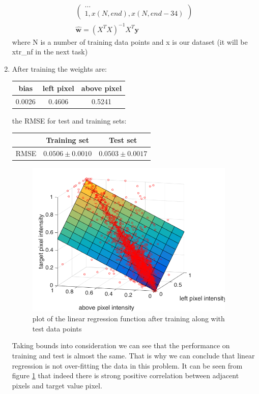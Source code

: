 \documentclass{article}
\newcommand{\vect}[1]{\boldsymbol{#1}} %
\begin{document}
\begin{enumerate}[label=(\alph*)]
\begin{gather*}
\begin{pmatrix}
						\ldots \\
						1, x(N, end), x(N, end -34)
						\end{pmatrix} \\
						\hat{\vect{w}} = (X^T X)^{-1} X^T \vect{y}
					\end{gather*}
					where N is a number of training data points and x is our dataset (it will be xtr\_nf in the next task)
				\item
					After training the weights are:
					\begin{center}
						\begin{tabular}{| c | c | c |}
							\hline
							bias & left pixel & above pixel \\ \hline
							0.0026  & 0.4606 & 0.5241 \\ 
							\hline
						\end{tabular}
					\end{center}					
					the RMSE for test and training sets:
					\begin{center}
						\begin{tabular}{| c | c | c |}
							\hline
							\, & Training set & Test set \\ \hline
							RMSE  & $0.0506 \pm 0.0010$ & $0.0503 \pm 0.0017$ \\ 
							\hline
						\end{tabular}
					\end{center}
				 	\begin{figure}[t]
				 		\centering
				 		\includegraphics[width=10cm]{images/p1-2-c}
				 		\caption{plot of the linear regression function after training along with test data points}
				 		\label{fig:p1-2-c}
				 	\end{figure}
					Taking bounds into consideration we can see that the performance on training and test is almost the same. That is why we can conclude that linear regression is not over-fitting the data in this problem. It can be seen from figure \ref{fig:p1-2-c} that indeed there is strong positive correlation between adjacent pixels and target value pixel. \\

\end{enumerate}
\end{document}
